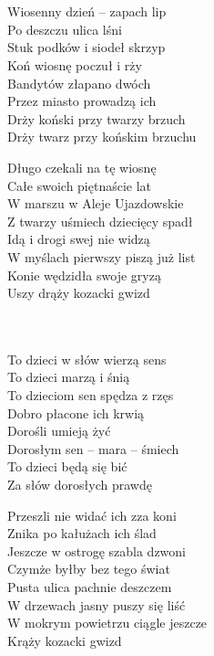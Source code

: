 \begin{text}
    \ifchorded{\hfill\break}\\
    \ifchorded{\hfill\break}\\
    Wiosenny dzień – zapach lip\\
    Po deszczu ulica lśni\\
    Stuk podków i siodeł skrzyp\\
    Koń wiosnę poczuł i rży\\
    Bandytów złapano dwóch\\
    Przez miasto prowadzą ich\\
    Drży koński przy twarzy brzuch\\
    Drży twarz przy końskim brzuchu

    Długo czekali na tę wiosnę\\
    Całe swoich piętnaście lat\\
    W marszu w Aleje Ujazdowskie\\
    Z twarzy uśmiech dziecięcy spadł\\
    Idą i drogi swej nie widzą\\
    W myślach pierwszy piszą już list\\
    Konie wędzidła swoje gryzą\\
    Uszy drąży kozacki gwizd

    \ifchorded{\hfill\break}\\
    \ifchorded{\hfill\break}\\
    To dzieci w słów wierzą sens\\
    To dzieci marzą i śnią\\
    To dzieciom sen spędza z rzęs\\
    Dobro płacone ich krwią\\
    Dorośli umieją żyć\\
    Dorosłym sen – mara – śmiech\\
    To dzieci będą się bić\\
    Za słów dorosłych prawdę

    Przeszli nie widać ich zza koni\\
    Znika po kałużach ich ślad\\
    Jeszcze w ostrogę szabla dzwoni\\
    Czymże byłby bez tego świat\\
    Pusta ulica pachnie deszczem\\
    W drzewach jasny puszy się liść\\
    W mokrym powietrzu ciągle jeszcze\\
    Krąży kozacki gwizd
\end{text}
